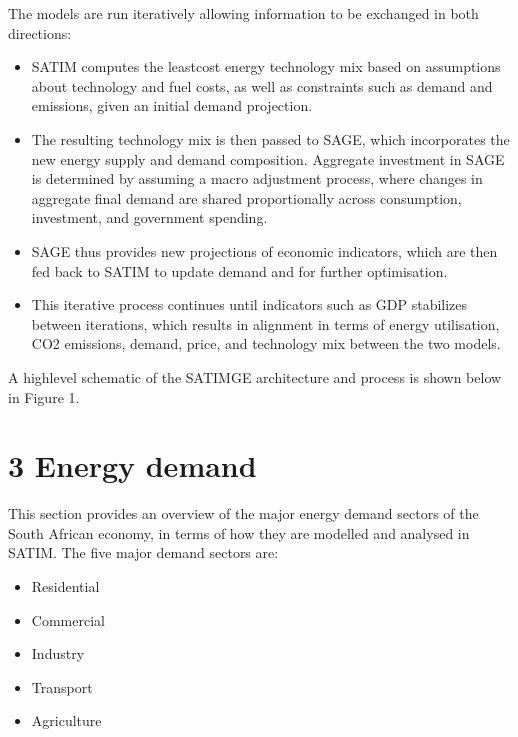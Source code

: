 \documentclass[letterpaper,10pt,english]{jupyterBook}
\begin{document}
\sphinxAtStartPar
The models are run iteratively allowing information to be exchanged in both directions:
\begin{itemize}
\item {} 
\sphinxAtStartPar
SATIM computes the least\sphinxhyphen{}cost energy technology mix based on assumptions about technology and fuel costs, as well as constraints such as demand and emissions, given an initial demand projection.

\item {} 
\sphinxAtStartPar
The resulting technology mix is then passed to SAGE, which incorporates the new energy supply and demand composition. Aggregate investment in SAGE is determined by assuming a macro adjustment process, where changes in aggregate final demand are shared proportionally across consumption, investment, and government spending.

\item {} 
\sphinxAtStartPar
SAGE thus provides new projections of economic indicators, which are then fed back to SATIM to update demand and for further optimisation.

\item {} 
\sphinxAtStartPar
This iterative process continues until indicators such as GDP stabilizes between iterations, which results in alignment in terms of energy utilisation, CO2 emissions, demand, price, and technology mix between the two models.

\end{itemize}

\sphinxAtStartPar
A high\sphinxhyphen{}level schematic of the SATIMGE architecture and process is shown below in Figure 1.

\sphinxAtStartPar
{} 

\sphinxstepscope


\chapter{3 Energy demand}
\label{\detokenize{03Energydemand:energy-demand}}\label{\detokenize{03Energydemand::doc}}
\sphinxAtStartPar
This section provides an overview of the major energy demand sectors of the South African economy, in terms of how they are modelled and analysed in SATIM. The five major demand sectors are:
\begin{itemize}
\item {} 
\sphinxAtStartPar
Residential

\item {} 
\sphinxAtStartPar
Commercial

\item {} 
\sphinxAtStartPar
Industry

\item {} 
\sphinxAtStartPar
Transport

\item {} 
\sphinxAtStartPar
Agriculture

\end{itemize}
\end{document}
